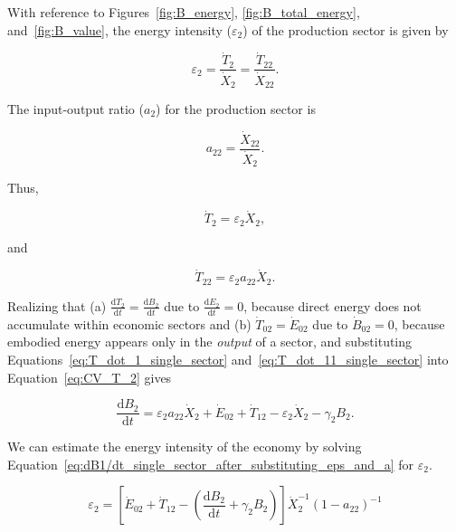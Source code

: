 With reference to Figures~\ref{fig:B_energy}, 
\ref{fig:B_total_energy},
and~\ref{fig:B_value}, 
the energy intensity ($\varepsilon_{2}$) 
of the production sector is given by

\begin{equation} \label{eq:single_sector_energy_intensity}
	\varepsilon_{2} 
	= \frac{\dot{T}_{2}}{\dot{X}_{2}} 
	= \frac{\dot{T}_{22}}{\dot{X}_{22}}.
\end{equation}

The input-output ratio ($a_{2}$) for the production sector is

\begin{equation} \label{eq:io_ratio_single_sector}
	a_{22} = \frac{\dot{X}_{22}}{\dot{X}_{2}}.
\end{equation}

\noindent{}Thus,

\begin{equation} \label{eq:T_dot_1_single_sector}
	\dot{T}_{2} = \varepsilon_{2}\dot{X}_{2},
\end{equation}

\noindent{}and

\begin{equation} \label{eq:T_dot_11_single_sector}
	\dot{T}_{22} = \varepsilon_{2}a_{22}\dot{X}_{2}.
\end{equation}

Realizing that 
(a) $\frac{\mathrm{d}T_2}{\mathrm{d}t} = \frac{\mathrm{d}B_2}{\mathrm{d}t}$ 
due to $\frac{\mathrm{d}E_2}{\mathrm{d}t} = 0$, because direct energy
does not accumulate within economic sectors and
(b) $\dot{T}_{02} = \dot{E}_{02}$ due to $\dot{B}_{02} = 0$, 
because embodied energy appears only in the \emph{output} of a sector, and
substituting Equations~\ref{eq:T_dot_1_single_sector} 
and~\ref{eq:T_dot_11_single_sector} into Equation~\ref{eq:CV_T_2} gives

\begin{equation} \label{eq:dB1/dt_single_sector_after_substituting_eps_and_a}
	\frac{\mathrm{d}B_{2}}{\mathrm{d}t} 
	= \varepsilon_{2}a_{22}\dot{X}_{2} 
	+ \dot{E}_{02} 
	+ \dot{T}_{12}
	- \varepsilon_{2}\dot{X}_{2} 
	- \gamma_{2}B_{2}.
\end{equation}

We can estimate the energy intensity of the economy by solving 
Equation~\ref{eq:dB1/dt_single_sector_after_substituting_eps_and_a} 
for $\varepsilon_{2}$.

\begin{equation} \label{eq:eps3_ss_IO}
	\varepsilon_{2} 
	= \left[\dot{E}_{02} 
	      + \dot{T}_{12}
	      - \left(\frac{\mathrm{d}B_{2}}{\mathrm{d}t} 
		          + \gamma_{2}B_{2}
			\right)
	  \right]
	\dot{X}_{2}^{-1} {(1 - a_{22})}^{-1}
\end{equation}

